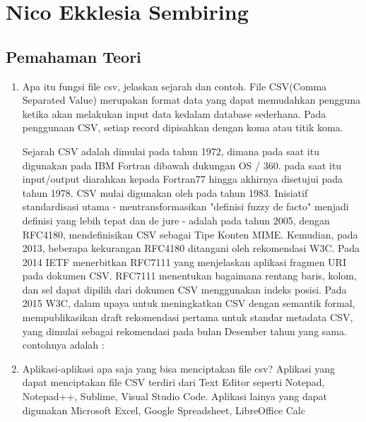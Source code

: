 \section{Nico Ekklesia Sembiring}
\subsection{Pemahaman Teori}
\begin{enumerate}
	\item Apa itu fungsi ﬁle csv, jelaskan sejarah dan contoh. \newline
	File CSV(Comma Separated Value) merupakan format data yang dapat memudahkan pengguna ketika akan melakukan input data kedalam database sederhana. Pada penggunaan CSV, setiap record dipisahkan dengan koma atau titik koma.\newline 

	Sejarah CSV adalah  dimulai pada tahun 1972, dimana pada saat itu digunakan pada IBM Fortran dibawah dukungan OS / 360. pada saat itu input/output diarahkan kepada Fortran77 hingga akhirnya disetujui pada tahun 1978. CSV mulai digunakan oleh pada tahun 1983. Inisiatif standardisasi utama - mentransformasikan "definisi fuzzy de facto" menjadi definisi yang lebih tepat dan de jure - adalah pada tahun 2005, dengan RFC4180, mendefinisikan CSV sebagai Tipe Konten MIME. Kemudian, pada 2013, beberapa kekurangan RFC4180 ditangani oleh rekomendasi W3C. Pada 2014 IETF menerbitkan RFC7111 yang menjelaskan aplikasi fragmen URI pada dokumen CSV. RFC7111 menentukan bagaimana rentang baris, kolom, dan sel dapat dipilih dari dokumen CSV menggunakan indeks posisi. Pada 2015 W3C, dalam upaya untuk meningkatkan CSV dengan semantik formal, mempublikasikan draft rekomendasi pertama untuk standar metadata CSV, yang dimulai sebagai rekomendasi pada bulan Desember tahun yang sama.
contohnya adalah :

	
	\item Aplikasi-aplikasi apa saja yang bisa menciptakan ﬁle csv?\newline
	Aplikasi yang dapat menciptakan file CSV terdiri dari Text Editor seperti Notepad, Notepad++, Sublime, Visual Studio Code. Aplikasi lainya yang dapat digunakan Microsoft Excel, Google Spreadsheet, LibreOffice Calc
	

\end{enumerate}
